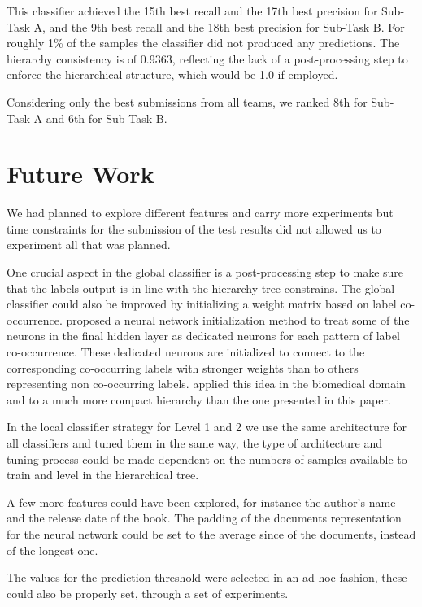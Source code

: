 \documentclass[11pt,a4paper]{article}
\begin{document}
This classifier achieved the 15th best recall and the 17th best precision
for Sub-Task A, and the 9th best recall and the 18th best precision for Sub-Task B.
For roughly 1\% of the samples the classifier did not produced any predictions.
The hierarchy consistency is of 0.9363, reflecting the lack of a post-processing
step to enforce the hierarchical structure, which would be 1.0 if employed.

Considering only the best submissions from all teams, we ranked 8th for
Sub-Task A and 6th for Sub-Task B.

\section{Future Work}\label{future}

We had planned to explore different features and carry more experiments but time
constraints for the submission of the test results did not allowed us to experiment
all that was planned.

One crucial aspect in the global classifier is a post-processing step to make
sure that the labels output is in-line with the hierarchy-tree constrains. The
global classifier could also be improved by initializing a weight matrix
based on label co-occurrence. \citet{kurata-etal-2016-improved} proposed a neural
network initialization method to treat some of the neurons in the final hidden
layer as dedicated neurons for each pattern of label co-occurrence. These dedicated
neurons are initialized to connect to the corresponding co-occurring labels with
stronger weights than to others representing non co-occurring labels. \citet{baker-korhonen-2017-initializing}
applied this idea in the biomedical domain and to a much more compact hierarchy
than the one presented in this paper.


In the local classifier strategy for Level 1 and 2 we use the same architecture
for all classifiers and tuned them in the same way, the type of architecture and
tuning process could be made dependent on the numbers of samples available to
train and level in the hierarchical tree.

A few more features could have been explored, for instance the author's name
and the release date of the book. The padding of the documents representation
for the neural network could be set to the average since of the documents,
instead of the longest one.

The values for the prediction threshold were selected in an ad-hoc fashion, these
could also be properly set, through a set of experiments.





\end{document}
